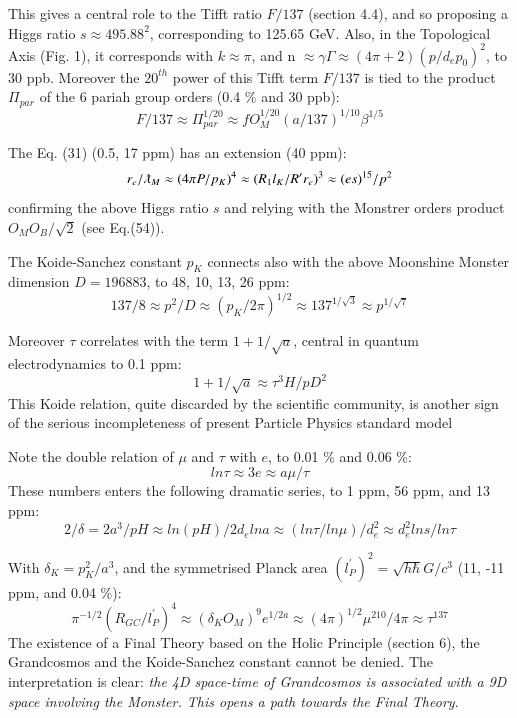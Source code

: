 \documentclass[twoside,draft]{article}
\begin{document}
\begin{sloppypar}
This gives a central role to the Tifft ratio $F/137$ (section 4.4), and so proposing a Higgs ratio $s \approx 495.88^2 $, corresponding to 125.65 GeV. Also, in the Topological Axis (Fig. 1), it corresponds with $k \approx \pi $, and n $\approx \gamma \Gamma \approx (4\pi + 2) (p/d_e p_0)^2$, to 30 ppb.
Moreover the $20^{th}$ power of this Tifft term $F/137$ is tied to the product $\Pi_{par}$ of the 6 pariah group orders (0.4 \% and 30 ppb):
$$ F/137 \approx \Pi_{par}^{1/20} \approx f O_M^{1/20}(a/137)^{1/10}\beta^{1/5}$$

The Eq. (31) (0.5, 17 ppm) has an extension (40 ppm):
\begin{equation}
r_{e}/\lambdabar_M \approx(4\pi P/p_K)^4 \approx (R_1l_K/R^{\prime}r_e)^3 \approx (es)^{15}/p^2  
\end{equation}
confirming the above Higgs ratio $s$ and relying with the Monstrer orders product $O_MO_B/\sqrt{2}$ (see Eq.(54)).

The Koide-Sanchez constant $p_K$ connects also with the above Moonshine Monster dimension \cite{Conway} $D = 196883$, to 48, 10, 13, 26 ppm:
$$137/8 \approx p^2/D  \approx (p_K/2\pi)^{1/2} \approx 137^{1/\sqrt3} \approx p^{1/\sqrt7}$$

Moreover $\tau$ correlates with the
term $1+1/\sqrt{a}$, central in quantum electrodynamics to 0.1 ppm:
\begin{equation}
1+1/\sqrt{a} \approx \tau^{3} H/pD^{2}
\end{equation}
This Koide relation, quite discarded by the scientific community, is another sign of the serious incompleteness of present Particle Physics standard model

Note the double relation of $\mu$ and $\tau$ with $e$, to 0.01 \% and 0.06 \%:
\begin{equation}
ln\tau \approx 3e \approx a\mu/\tau 
\end{equation}
These numbers enters the following dramatic series, to 1 ppm, 56 ppm, and 13 ppm:
\begin{equation}
2/\delta = 2a^3/pH \approx ln(pH)/2d_e lna \approx (ln\tau/ln\mu)/d_e^2 \approx d_e^2 ln s/ln\tau
\end{equation}


With $\delta_K = p_K^2/a^3 $, and the symmetrised Planck area $(l_P^{\prime})^2 = \sqrt{h \hbar} G/c^3$ (11, -11 ppm, and 0.04 \%):
\begin{equation}
\pi^{-1/2}(R_{GC}/l_P^{\prime})^4 \approx (\delta_K O_M )^9 e^{1/2a} \approx (4\pi)^{1/2}  \mu^{210}/4\pi \approx \tau^{137}
\end{equation}
The existence of a Final Theory based on the Holic Principle (section 6), the Grandcosmos and the Koide-Sanchez constant cannot be denied. The interpretation is clear: \textit{the 4D space-time of Grandcosmos is associated with a 9D space involving the Monster. This opens a path towards the Final Theory}. 


\end{sloppypar}
\end{document}
